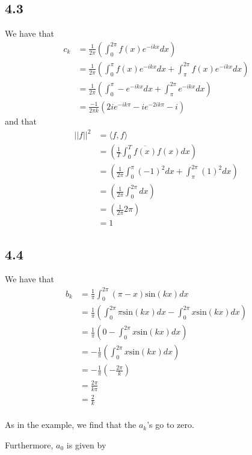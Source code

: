 \documentclass[letterpaper,12pt]{article}
\theoremstyle{definition}
\begin{document}
\subsection*{4.3}
We have that
\begin{align*}
    c_k &= \frac{1}{2\pi} \left( \int^{2\pi}_{0} f(x)e^{-ikx}  dx \right)\\
    &= \frac{1}{2\pi} \left( \int^{\pi}_{0} f(x)e^{-ikx}  dx + \int^{2\pi}_{\pi} f(x)e^{-ikx}  dx  \right)\\
    &= \frac{1}{2\pi} \left( \int^{\pi}_{0} -e^{-ikx}  dx + \int^{2\pi}_{\pi} e^{-ikx}  dx  \right)\\
    &= \frac{-1}{2 \pi k} (2ie^{-ik \pi} - ie^{-2ik \pi} - i)
\end{align*}
and that
\begin{align*}
    ||f||^2 &= \langle f, f \rangle \\
    &= \left( \frac{1}{T} \int^{T}_{0} \overline {f(x)} f(x) dx \right)  \\
    &= \left( \frac{1}{2 \pi} \int^{\pi}_{0} (-1)^2 dx + \int^{2\pi}_{\pi} (1)^2 dx\right)  \\
    &= \left( \frac{1}{2 \pi} \int^{2\pi}_{0}dx\right)  \\
    &= \left( \frac{1}{2 \pi} 2\pi\right)  \\
    &= 1 
\end{align*}

\subsection*{4.4}
We have that
\begin{align*}
b_k &= \frac{1}{\pi} \int^{2\pi}_{0} (\pi - x) \text{sin}(kx) dx\\
&= \frac{1}{\pi} \left(  \int^{2\pi}_{0} \pi \text{sin}(kx) dx - \int^{2\pi}_{0} x \text{sin}(kx) dx\right)\\
&= \frac{1}{\pi} \left(  0 - \int^{2\pi}_{0} x \text{sin}(kx) dx\right)\\
&= -\frac{1}{\pi} \left(  \int^{2\pi}_{0} x \text{sin}(kx) dx\right)\\
&= - \frac{1}{\pi} \left(  -\frac{2\pi}{k}\right)\\
&=  \frac{2\pi}{k\pi} \\
&=  \frac{2}{k} \\
\end{align*}

As in the example, we find that the $a_k$'s go to zero.

Furthermore, $a_0$ is given by
\end{document}
